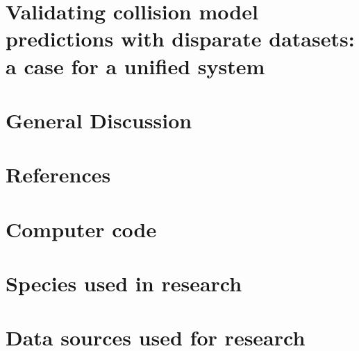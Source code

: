\documentclass[titlesmallcaps,copyrightpage,examinerscopy]{uomthesis}
\begin{document}
%
\chapter{Validating collision model predictions with disparate datasets: a case for a unified system}\label{sec:val}
\clearpage{\pagestyle{empty}\cleardoublepage}

%
\chapter{General Discussion}\label{sec:conc}
\clearpage{\pagestyle{empty}\cleardoublepage}

%

{
\backmatter
\chapter{References}

\clearpage{\pagestyle{empty}\cleardoublepage}
}

\clearpage
\appendix
{}
\clearpage{\pagestyle{empty}\cleardoublepage}

%
\chapter{Computer code}\label{apx:A}
\clearpage{\pagestyle{empty}\cleardoublepage}

%
\chapter{Species used in research}\label{apx:B}
\clearpage{\pagestyle{empty}\cleardoublepage}

%
\chapter{Data sources used for research}\label{apx:C}
\clearpage{\pagestyle{empty}\cleardoublepage}


\clearpage{\pagestyle{empty}\cleardoublepage}
\end{document}
